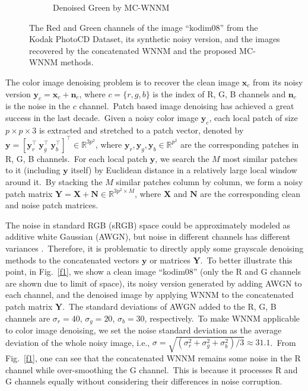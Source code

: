 \begin{figure}
\begin{subfigure}[t]{0.24\textwidth}
\caption{Denoised Green by MC-WNNM}
    \end{subfigure}
    \caption{The Red and Green channels of the image ``kodim08'' from the Kodak PhotoCD Dataset, its synthetic noisy version, and the images recovered by the concatenated WNNM and the proposed MC-WNNM methods.}
    \label{fig1}
\end{figure}

The color image denoising problem is to recover the clean image $\mathbf{x}_{c}$ from its noisy version $\mathbf{y}_{c}=\mathbf{x}_{c}+\mathbf{n}_{c}$, where $c=\{r, g, b\}$ is the index of R, G, B channels and $\mathbf{n}_{c}$ is the noise in the $c$ channel.\ Patch based image denoising \cite{foe,ksvd,bm3d,lssc,epll,ncsr,mlp,csf,wnnm,pgpd,chen2015learning,dncnn} has achieved a great success in the last decade.\ Given a noisy color image $\mathbf{y}_{c}$, each local patch of size $p\times p \times 3$ is extracted and stretched to a patch vector, denoted by $\mathbf{y}=[\mathbf{y}_{r}^{\top}\ \mathbf{y}_{g}^{\top}\ \mathbf{y}_{b}^{\top}]^{\top}\in\mathbb{R}^{3p^{2}}$, where $\mathbf{y}_{r}, \mathbf{y}_{g}, \mathbf{y}_{b}\in\mathbb{R}^{p^{2}}$ are the corresponding patches in R, G, B channels.\ For each local patch $\mathbf{y}$, we search the $M$ most similar patches to it (including $\mathbf{y}$ itself) by Euclidean distance in a relatively large local window around it.\ By stacking the $M$ similar patches column by column, we form a noisy patch matrix $\mathbf{Y}=\mathbf{X}+\mathbf{N}\in\mathbb{R}^{3p^{2}\times M}$, where $\mathbf{X}$ and $\mathbf{N}$ are the corresponding clean and noise patch matrices.

The noise in standard RGB (sRGB) space could be approximately modeled as additive white Gaussian (AWGN), but noise in different channels has different variances \cite{Liu2008,Leungtip,crosschannel2016}.\ Therefore, it is problematic to directly apply some grayscale denoising methods to the concatenated vectors $\mathbf{y}$ or matrices $\mathbf{Y}$.\ To better illustrate this point, in Fig.\ \ref{f1}, we show a clean image ``kodim08'' (only the R and G channels are shown due to limit of space), its noisy version generated by adding AWGN to each channel, and the denoised image by applying WNNM \cite{wnnmijcv} to the concatenated  patch matrix $\mathbf{Y}$.\ The standard deviations of AWGN added to the R, G, B channels are $\sigma_{r}=40$, $\sigma_{g}=20$, $\sigma_{b}=30$, respectively.\ To make WNNM applicable to color image denoising, we set the noise standard deviation as the average deviation of the whole noisy image, i.e., $\sigma=\sqrt{(\sigma_{r}^{2}+\sigma_{g}^{2}+\sigma_{b}^{2})/3}\approx31.1$.\ From Fig.\ \ref{f1}, one can see that the concatenated WNNM remains some noise in the R channel while over-smoothing the G channel.\ This is because it processes R and G channels equally without considering their differences in noise corruption.

